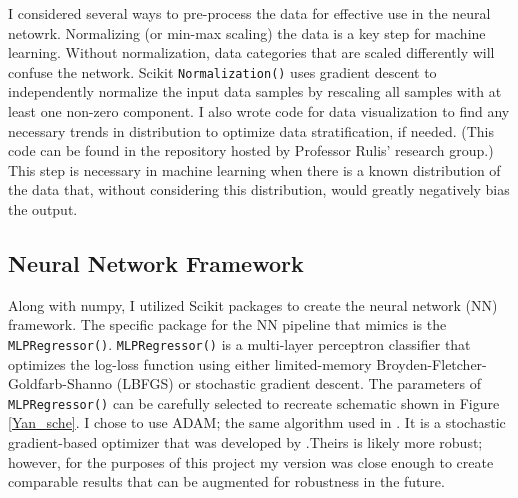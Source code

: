 \documentclass{article}
\begin{document}
I considered several ways to pre-process the data for effective use in the neural netowrk. 
Normalizing (or min-max scaling) the data is a key step for machine learning. Without 
normalization, data categories that are scaled differently 
will confuse the network. Scikit \texttt{Normalization()} uses gradient descent to 
independently normalize the input data samples by rescaling all samples with at least one 
non-zero component. I also wrote code for data visualization 
to find any necessary trends in distribution to optimize data stratification, if needed. 
(This code can be found in the repository hosted by Professor Rulis' research group.) This step 
is necessary in machine learning when there is a known distribution of the data that, without 
considering this distribution, would greatly negatively bias the output. 

\subsection{Neural Network Framework}

Along with numpy, I utilized Scikit packages to create the neural network (NN) framework. The 
specific package for the NN pipeline that mimics \cite{Yanxon2020} is the \texttt{MLPRegressor()}.
\texttt{MLPRegressor()} is a multi-layer perceptron classifier that optimizes the log-loss 
function using either limited-memory Broyden-Fletcher-Goldfarb-Shanno (LBFGS) or stochastic gradient descent. 
The parameters of \texttt{MLPRegressor()} can
be carefully selected to recreate schematic shown in Figure \ref{Yan_sche}. I chose to use ADAM; 
the same algorithm used in \cite{Yanxon2020}. It is a stochastic gradient-based optimizer that was
developed by \cite{Adam}.Theirs is likely more robust; however, for the purposes of this project 
my version was close enough to create comparable results that can be augmented for robustness in 
the future.
\end{document}
